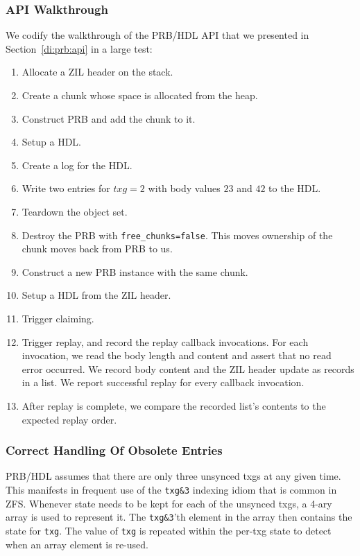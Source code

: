 \documentclass[12pt,a4paper,twoside]{book}
\begin{document}
{\subsubsection{API Walkthrough}
We codify the walkthrough of the PRB/HDL API that we presented in Section~\ref{di:prb:api} in a large test:
\begin{enumerate}[noitemsep]
    \item Allocate a ZIL header on the stack.
    \item Create a chunk whose space is allocated from the heap.
    \item Construct PRB and add the chunk to it.
    \item Setup a HDL.
    \item Create a log for the HDL.
    \item Write two entries for $txg=2$ with body values $23$ and $42$ to the HDL.
    \item Teardown the object set.
    \item Destroy the PRB with \lstinline{free_chunks=false}. This moves ownership of the chunk moves back from PRB to us.
    \item Construct a new PRB instance with the same chunk.
    \item Setup a HDL from the ZIL header.
    \item Trigger claiming.
    \item Trigger replay, and record the replay callback invocations.
        For each invocation, we read the body length and content and assert that no read error occurred.
        We record body content and the ZIL header update as records in a list.
        We report successful replay for every callback invocation.
    \item After replay is complete, we compare the recorded list's contents to the expected replay order.
\end{enumerate}

\subsubsection{Correct Handling Of Obsolete Entries}
PRB/HDL assumes that there are only three unsynced txgs at any given time.
This manifests in frequent use of the \lstinline{txg&3} indexing idiom that is common in ZFS.
Whenever state needs to be kept for each of the unsynced txgs, a 4-ary array is used to represent it.
The \lstinline{txg&3}'th element in the array then contains the state for \lstinline{txg}.
The value of \lstinline{txg} is repeated within the per-txg state to detect when an array element is re-used.

}
\end{document}
